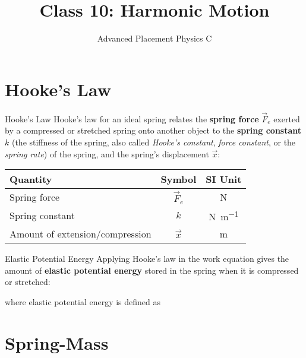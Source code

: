 \documentclass[12pt,compress,aspectratio=169]{beamer}
\title{Class 10: Harmonic Motion}
\subtitle{Advanced Placement Physics C}
\begin{document}
\begin{frame}
  \maketitle
\end{frame}


\section{Hooke's Law}

\begin{frame}{Hooke's Law}
  Hooke's law for an ideal spring relates the \textbf{spring force} $\vec F_e$
  exerted by a compressed or stretched spring onto another object to the
  \textbf{spring constant} $k$ (the stiffness of the spring, also called
  \emph{Hooke's constant}, \emph{force constant}, or the \emph{spring rate}) of
  the spring, and the spring's displacement $\vec x$:

  \begin{center}
    \begin{tabular}{l|c|c}
      \rowcolor{pink}
      \textbf{Quantity} & \textbf{Symbol} & \textbf{SI Unit} \\ \hline
      Spring force                    & $\vec F_e$ & \si\newton \\
      Spring constant                 & $k$        & \si{\newton\per\metre}\\
      Amount of extension/compression & $\vec x$   & \si\metre
    \end{tabular}
  \end{center}
\end{frame}



\begin{frame}{Elastic Potential Energy}
  Applying Hooke's law in the work equation gives the amount of \textbf{elastic
    potential energy} stored in the spring when it is compressed or stretched:


  where elastic potential energy is defined as

\end{frame}



\section{Spring-Mass}
\end{document}
